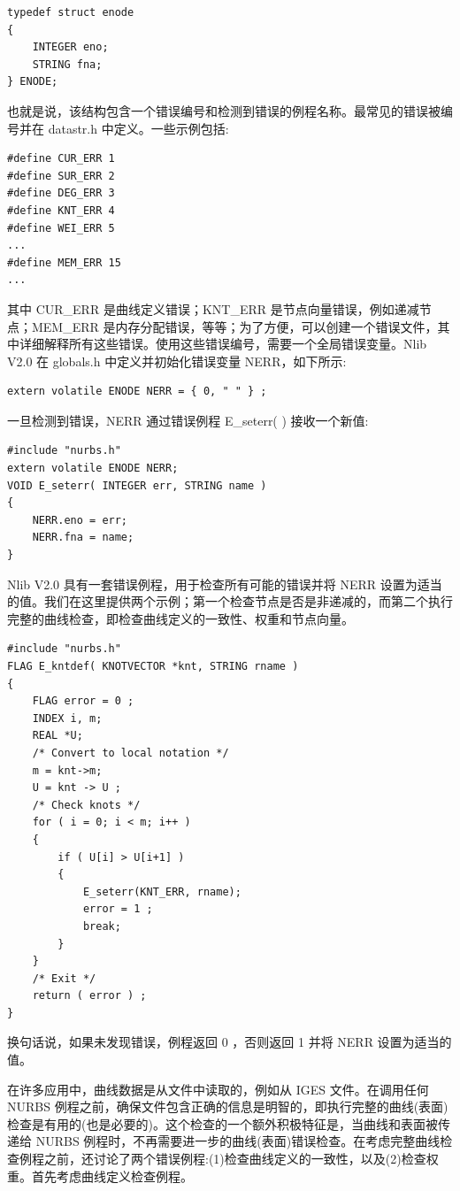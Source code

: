 \documentclass[../main.tex]{subfiles}
\begin{document}
\begin{verbatim}
typedef struct enode
{
    INTEGER eno;
    STRING fna;
} ENODE;
\end{verbatim}

也就是说，该结构包含一个错误编号和检测到错误的例程名称。最常见的错误被编号并在 datastr.h 中定义。一些示例包括:

\begin{verbatim}
#define CUR_ERR 1
#define SUR_ERR 2
#define DEG_ERR 3
#define KNT_ERR 4
#define WEI_ERR 5
...
#define MEM_ERR 15
...
\end{verbatim}

其中 CUR\_ERR 是曲线定义错误；KNT\_ERR 是节点向量错误，例如递减节点；MEM\_ERR 是内存分配错误，等等；为了方便，可以创建一个错误文件，其中详细解释所有这些错误。使用这些错误编号，需要一个全局错误变量。Nlib V2.0 在 globals.h 中定义并初始化错误变量 NERR，如下所示:

\begin{verbatim}
extern volatile ENODE NERR = { 0, " " } ;
\end{verbatim}

一旦检测到错误，NERR 通过错误例程 E\_seterr(   ) 接收一个新值:

\begin{verbatim}
#include "nurbs.h"
extern volatile ENODE NERR;
VOID E_seterr( INTEGER err, STRING name )
{
    NERR.eno = err;
    NERR.fna = name;
}
\end{verbatim}

Nlib V2.0 具有一套错误例程，用于检查所有可能的错误并将 NERR 设置为适当的值。我们在这里提供两个示例；第一个检查节点是否是非递减的，而第二个执行完整的曲线检查，即检查曲线定义的一致性、权重和节点向量。

\begin{verbatim}
#include "nurbs.h"
FLAG E_kntdef( KNOTVECTOR *knt, STRING rname )
{
    FLAG error = 0 ;
    INDEX i, m;
    REAL *U;
    /* Convert to local notation */
    m = knt->m;
    U = knt -> U ;
    /* Check knots */
    for ( i = 0; i < m; i++ )
    {
        if ( U[i] > U[i+1] )
        {
            E_seterr(KNT_ERR, rname);
            error = 1 ;
            break;
        }
    }
    /* Exit */
    return ( error ) ;
}
\end{verbatim}

换句话说，如果未发现错误，例程返回 0 ，否则返回 1 并将 NERR 设置为适当的值。

在许多应用中，曲线数据是从文件中读取的，例如从 IGES 文件。在调用任何 NURBS 例程之前，确保文件包含正确的信息是明智的，即执行完整的曲线(表面)检查是有用的(也是必要的)。这个检查的一个额外积极特征是，当曲线和表面被传递给 NURBS 例程时，不再需要进一步的曲线(表面)错误检查。在考虑完整曲线检查例程之前，还讨论了两个错误例程:(1)检查曲线定义的一致性，以及(2)检查权重。首先考虑曲线定义检查例程。
\end{document}

